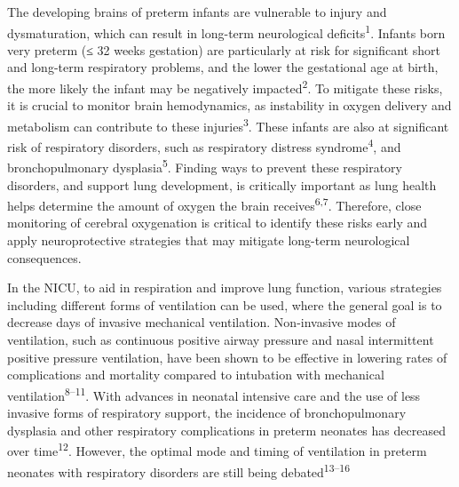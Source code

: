 \documentclass[
  letterpaper,
  DIV=11,
  numbers=noendperiod]{scrartcl}
\begin{document}
The developing brains of preterm infants are vulnerable to injury and
dysmaturation, which can result in long-term neurological
deficits\textsuperscript{1}. Infants born very preterm (≤ 32 weeks
gestation) are particularly at risk for significant short and long-term
respiratory problems, and the lower the gestational age at birth, the
more likely the infant may be negatively impacted\textsuperscript{2}. To
mitigate these risks, it is crucial to monitor brain hemodynamics, as
instability in oxygen delivery and metabolism can contribute to these
injuries\textsuperscript{3}. These infants are also at significant risk
of respiratory disorders, such as respiratory distress
syndrome\textsuperscript{4}, and bronchopulmonary
dysplasia\textsuperscript{5}. Finding ways to prevent these respiratory
disorders, and support lung development, is critically important as lung
health helps determine the amount of oxygen the brain
receives\textsuperscript{6,7}. Therefore, close monitoring of cerebral
oxygenation is critical to identify these risks early and apply
neuroprotective strategies that may mitigate long-term neurological
consequences.

In the NICU, to aid in respiration and improve lung function, various
strategies including different forms of ventilation can be used, where
the general goal is to decrease days of invasive mechanical ventilation.
Non-invasive modes of ventilation, such as continuous positive airway
pressure and nasal intermittent positive pressure ventilation, have been
shown to be effective in lowering rates of complications and mortality
compared to intubation with mechanical
ventilation\textsuperscript{8--11}. With advances in neonatal intensive
care and the use of less invasive forms of respiratory support, the
incidence of bronchopulmonary dysplasia and other respiratory
complications in preterm neonates has decreased over
time\textsuperscript{12}. However, the optimal mode and timing of
ventilation in preterm neonates with respiratory disorders are still
being debated\textsuperscript{13--16}
\end{document}
